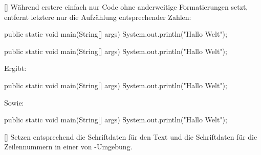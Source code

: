 [\cmdlist {}]
Während erstere einfach nur Code ohne anderweitige Formatierungen setzt, entfernt letztere nur die Aufzählung entsprechender Zahlen:
\begin{latex}
\begin{lstplain}[language=lJava]
public static void main(String[] args) {
    System.out.println("Hallo Welt");
}
\end{lstplain}
\begin{lstnonum}[language=lJava]
public static void main(String[] args) {
    System.out.println("Hallo Welt");
}
\end{lstnonum}
\end{latex}
Ergibt:
\begin{lstplain}[language=lJava]
public static void main(String[] args) {
    System.out.println("Hallo Welt");
}
\end{lstplain}
Sowie:
\begin{lstnonum}[language=lJava]
public static void main(String[] args) {
    System.out.println("Hallo Welt");
}
\end{lstnonum}

%
%
%

[\cmdlist{}]
Setzen entsprechend die Schriftdaten für den Text und die Schriftdaten für die Zeilennummern in einer von -Umgebung.

